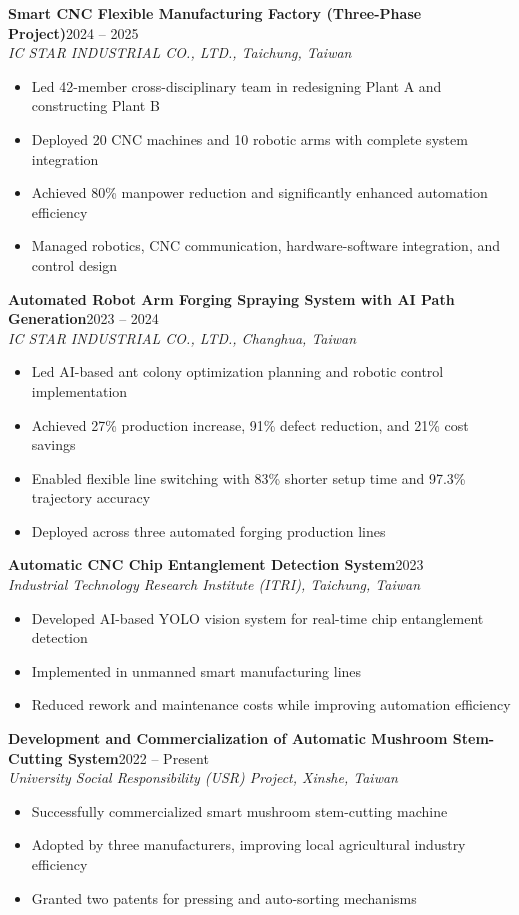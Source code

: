 \documentclass[11pt,a4paper]{article}
\newcommand{\cventry}[4]{
    \noindent\textbf{#1}\hfill#2\\
    \textit{#3}\\
    #4
    \vspace{0.3cm}
}
\begin{document}
\cventry{Smart CNC Flexible Manufacturing Factory (Three-Phase Project)}{2024 -- 2025}
{IC STAR INDUSTRIAL CO., LTD., Taichung, Taiwan}
{
    \begin{itemize}[leftmargin=*, itemsep=0pt]
        \item Led 42-member cross-disciplinary team in redesigning Plant A and constructing Plant B
        \item Deployed 20 CNC machines and 10 robotic arms with complete system integration
        \item Achieved 80\% manpower reduction and significantly enhanced automation efficiency
        \item Managed robotics, CNC communication, hardware-software integration, and control design
    \end{itemize}
}

\cventry{Automated Robot Arm Forging Spraying System with AI Path Generation}{2023 -- 2024}
{IC STAR INDUSTRIAL CO., LTD., Changhua, Taiwan}
{
    \begin{itemize}[leftmargin=*, itemsep=0pt]
        \item Led AI-based ant colony optimization planning and robotic control implementation
        \item Achieved 27\% production increase, 91\% defect reduction, and 21\% cost savings
        \item Enabled flexible line switching with 83\% shorter setup time and 97.3\% trajectory accuracy
        \item Deployed across three automated forging production lines
    \end{itemize}
}

\cventry{Automatic CNC Chip Entanglement Detection System}{2023}
{Industrial Technology Research Institute (ITRI), Taichung, Taiwan}
{
    \begin{itemize}[leftmargin=*, itemsep=0pt]
        \item Developed AI-based YOLO vision system for real-time chip entanglement detection
        \item Implemented in unmanned smart manufacturing lines
        \item Reduced rework and maintenance costs while improving automation efficiency
    \end{itemize}
}

\cventry{Development and Commercialization of Automatic Mushroom Stem-Cutting System}{2022 -- Present}
{University Social Responsibility (USR) Project, Xinshe, Taiwan}
{
    \begin{itemize}[leftmargin=*, itemsep=0pt]
        \item Successfully commercialized smart mushroom stem-cutting machine
        \item Adopted by three manufacturers, improving local agricultural industry efficiency
        \item Granted two patents for pressing and auto-sorting mechanisms
    \end{itemize}
}
\end{document}

